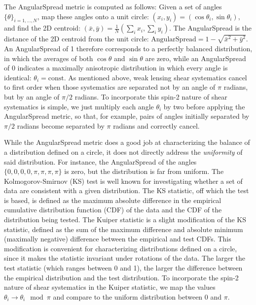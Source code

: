 The AngularSpread metric is computed as follows:  Given a set of angles
$\{\theta\}_{i=1, ..., N}$, map these angles onto a unit circle: $(x_i, y_i) =
(\cos \theta_i, \sin \theta_i)$, and find the 2D centroid: $(\bar{x}, \bar{y}) =
\frac{1}{N} (\sum_i x_i, \sum_i y_i)$.  The AngularSpread is the distance of the
2D centroid from the unit circle: $\mathrm{AngularSpread} = 1 - \sqrt{\bar{x}^2 +
\bar{y}^2}$.  An AngularSpread of 1 therefore corresponds to a perfectly
balanced distribution, in which the averages of both $\cos \theta$ and $\sin
\theta$ are zero, while an AngularSpread of 0 indicates a maximally anisotropic
distribution in which every angle is identical: $\theta_i = \mathrm{const}$.  As
mentioned above, weak lensing shear systematics cancel to first order when those
systematics are separated not by an angle of $\pi$ radians, but by an angle of
$\pi/2$ radians.  To incorporate this spin-2 nature of shear systematics is
simple, we just multiply each angle $\theta_i$ by two before applying the
AngularSpread metric, so that, for example, pairs of angles initially separated
by $\pi/2$ radians become separated by $\pi$ radians and correctly cancel.

While the AngularSpread metric does a good job at characterizing the balance of
a distribution defined on a circle, it does not directly address the {\emph
{uniformity}} of said distribution.  For instance, the AngularSpread of the
angles $\{0, 0, 0, 0, \pi, \pi, \pi, \pi\}$ is zero, but the distribution is far
from uniform.  The Kolmogorov-Smirnov (KS) test is well known for investigating
whether a set of data are consistent with a given distribution.  The KS
statistic, off which the test is based, is defined as the maximum absolute
difference in the empirical cumulative distribution function (CDF) of the data
and the CDF of the distribution being tested.  The Kuiper statistic is a slight
modification of the KS statistic, defined as the sum of the maximum difference
and absolute minimum (maximally negative) difference between the empirical and
test CDFs.  This modification is convenient for characterizing distributions
defined on a circle, since it makes the statistic invariant under rotations of
the data.  The larger the test statistic (which ranges between 0 and 1), the
larger the difference between the empirical distribution and the test
distribution.  To incorporate the spin-2 nature of shear systematics in the
Kuiper statistic, we map the values $\theta_i \rightarrow \theta_i \mod \pi$ and
compare to the uniform distribution between 0 and $\pi$.


